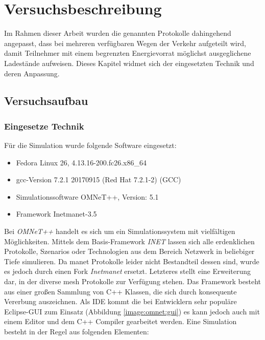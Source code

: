 
\chapter{Versuchsbeschreibung}
\label{chapter:versuch}

Im Rahmen dieser Arbeit wurden die genannten Protokolle dahingehend angepasst, dass bei mehreren verfügbaren Wegen der Verkehr aufgeteilt wird, damit Teilnehmer mit einem begrenzten Energievorrat möglichst ausgeglichene Ladestände aufweisen. Dieses Kapitel widmet sich der eingesetzten Technik und deren Anpassung.

\section{Versuchsaufbau}
\label{chapter:versuch:aufbau}

\subsection{Eingesetze Technik}
\label{chapter:versuch:aufbau:technik}

Für die Simulation wurde folgende Software eingesetzt:

\begin{itemize}
\item Fedora Linux 26, 4.13.16-200.fc26.x86\_64
\item gcc-Version 7.2.1 20170915 (Red Hat 7.2.1-2) (GCC) 
\item Simulationssoftware OMNeT++, Version: 5.1
\item Framework Inetmanet-3.5
\end{itemize}

Bei \textit{OMNeT++} handelt es sich um ein Simulationssystem mit vielfältigen Möglichkeiten. Mittels dem Basis-Framework \textit{INET} lassen sich alle erdenklichen Protokolle, Szenarios oder Technologien aus dem Bereich Netzwerk in beliebiger Tiefe simulieren. Da \gls{manet} Protokolle leider nicht Bestandteil dessen sind, wurde es jedoch durch einen Fork \textit{Inetmanet} ersetzt. Letzteres stellt eine Erweiterung dar, in der diverse \gls{mesh} Protokolle zur Verfügung stehen. Das Framework besteht aus einer großen Sammlung von C++ Klassen, die sich durch konsequente Vererbung auszeichnen. Als IDE kommt die bei Entwicklern sehr populäre Eclipse-GUI zum Einsatz (Abbildung \ref{image:omnet:gui}) es kann jedoch auch mit einem Editor und dem C++ Compiler gearbeitet werden. Eine Simulation besteht in der Regel aus folgenden Elementen:

